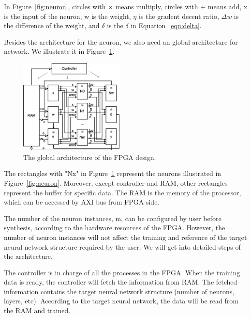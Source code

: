 \documentclass[conference]{IEEEtran}
\begin{document}
In Figure~\ref{fig:neuron}, circles with $\times$ means multiply, circles with $+$ means add, x is the input of the neuron, w is the weight, $\eta$ is the gradent decent ratio, $\Delta w$ is the difference of the weight, and $\delta$ is the $\delta$ in Equation~\ref{equ:delta}.  

Besides the architecture for the neuron, we also need an global architecture for network. We illustrate it in Figure~\ref{fig:global}.

\begin{figure}[!hbt]
	\centering
	\includegraphics[width=0.47\textwidth]{global.png}
	\caption{The global architecture of the FPGA design.}
	\label{fig:global}
\end{figure}

The rectangles with "Nx" in Figure~\ref{fig:global} represent the neurons illustrated in Figure~\ref{fig:neuron}. Moreover, except controller and RAM, other rectangles represent the buffer for specific data. The RAM is the memory of the processor, which can be accessed by AXI bus from FPGA side.

The number of the neuron instances, m, can be configured by user before synthesis, according to the hardware resources of the FPGA. However, the number of neuron instances will not affect the training and reference of the target neural network structure required by the user. We will get into detailed steps of the architecture.

The controller is in charge of all the processes in the FPGA.  When the training data is ready, the controller will fetch the information from RAM. The fetched information contains the target neural network structure (number of neurons, layers, etc). According to the target neural network, the data will be read from the RAM and trained.
\end{document}
